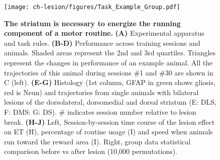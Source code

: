 \begin{figure}[bth!]
 \begin{center}
	\texttt{[image: ch-lesion/figures/Task\_Example\_Group.pdf]}
	\caption[The Striatum Energizes Motor Routines]
	{\textbf{The striatum is necessary to energize the running component of a motor routine.}
	\textbf{(A)} Experimental apparatus and task rules.
	\textbf{(B-D)} Performance across training sessions and animals.
	Shaded areas represent the 2nd and 3rd quartiles. Triangles represent the changes in performance of an example animal. 
	All the trajectories of this animal during sessions \#1 and \#30 are shown in C (left). 
	\textbf{(E-G)} Histology (1st column, GFAP in green shows gliosis, red is Neun) and trajectories from single animals with bilateral lesions of the dorsolateral, dorsomedial and dorsal striatum (E: DLS, F: DMS: G: DS).
	\# indicates session number relative to lesion break.
	\textbf{(H-J)} Left, Session-by-session time course of the lesion effect on ET (H), percentage of routine usage (I) and speed when animals run toward the reward area (I).
	Right, group data statistical comparison before vs after lesion (10,000 permutations).
	}
	\label{fig:lesion:task}
 \end{center}
\end{figure}